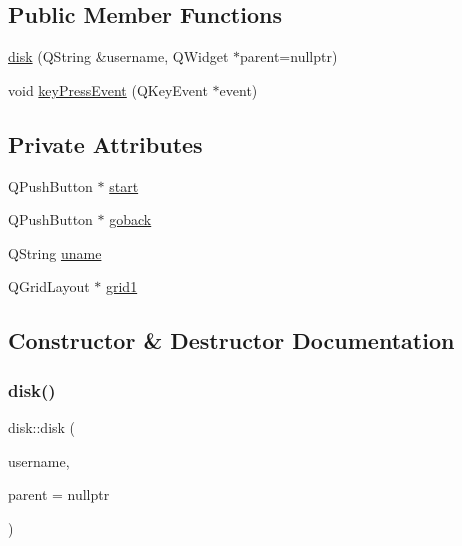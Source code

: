 \subsection*{Public Member Functions}
\begin{DoxyCompactItemize}
\item 
\hyperlink{classdisk_ae8d9b531677cf773fcddef292b9317f0}{disk} (Q\+String \&username, Q\+Widget $\ast$parent=nullptr)
\item 
void \hyperlink{classdisk_a24be400d4bdc6900427e2236abdfe67b}{key\+Press\+Event} (Q\+Key\+Event $\ast$event)
\end{DoxyCompactItemize}
\subsection*{Private Attributes}
\begin{DoxyCompactItemize}
\item 
Q\+Push\+Button $\ast$ \hyperlink{classdisk_a9e1746eb3b2679d99de542100a8d6a93}{start}
\item 
Q\+Push\+Button $\ast$ \hyperlink{classdisk_abc6a3e9a9d9b0fba08c96c4d099ffd84}{goback}
\item 
Q\+String \hyperlink{classdisk_a16c51fecafdb4e1297d598545acc6cbc}{uname}
\item 
Q\+Grid\+Layout $\ast$ \hyperlink{classdisk_a19f7522d08f9644b731fa1a175825af9}{grid1}
\end{DoxyCompactItemize}


\subsection{Constructor \& Destructor Documentation}
\mbox{\label{classdisk_ae8d9b531677cf773fcddef292b9317f0}} 
\subsubsection{\texorpdfstring{disk()}{disk()}}
{\footnotesize\ttfamily disk\+::disk (\begin{DoxyParamCaption}\item[{Q\+String \&}]{username,  }\item[{Q\+Widget $\ast$}]{parent = {\ttfamily nullptr} }\end{DoxyParamCaption})\hspace{0.3cm}{\ttfamily [explicit]}}

